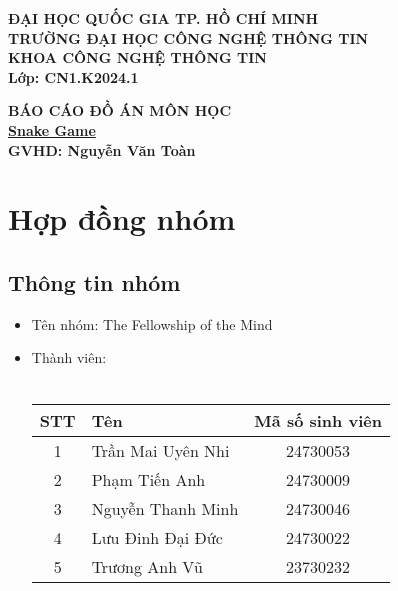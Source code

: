 \documentclass[a4paper, 12pt]{article}
\title{}
\author{}
\date{}
\begin{document}
\maketitle

\begin{center}
    \large \textbf{ĐẠI HỌC QUỐC GIA TP. HỒ CHÍ MINH}\\
    \large \textbf{TRƯỜNG ĐẠI HỌC CÔNG NGHỆ THÔNG TIN}\\
    \large \textbf{KHOA CÔNG NGHỆ THÔNG TIN}\\[2cm]
    
    \textbf{Lớp: CN1.K2024.1}\\
    \vspace{0.5cm}
    
    \vspace{2cm}
    \Large \textbf{BÁO CÁO ĐỒ ÁN MÔN HỌC}\\[0.5cm]
    \Large \textbf{\underline{Snake Game}}\\[0.5cm]
    \Large \textbf{GVHD: Nguyễn Văn Toàn}\\[0.5cm]
    \vspace{2cm}

    \vspace{1cm}
\end{center}

\newpage
\tableofcontents
\newpage

\section{Hợp đồng nhóm}
\subsection{Thông tin nhóm}
\begin{itemize}
    \item Tên nhóm: The Fellowship of the Mind
    \item Thành viên:\\\\
        \begin{tabular}{|c|l|c|}
            \hline
            \textbf{STT} & \textbf{Tên} & \textbf{Mã số sinh viên} \\
            \hline
            1 & Trần Mai Uyên Nhi & 24730053 \\
            \hline
            2 & Phạm Tiến Anh & 24730009 \\
            \hline
            3 & Nguyễn Thanh Minh & 24730046 \\
            \hline
            4 & Lưu Đinh Đại Đức & 24730022 \\
            \hline
            5 & Trương Anh Vũ & 23730232 \\
            \hline
        \end{tabular}
\end{itemize}
\end{document}
